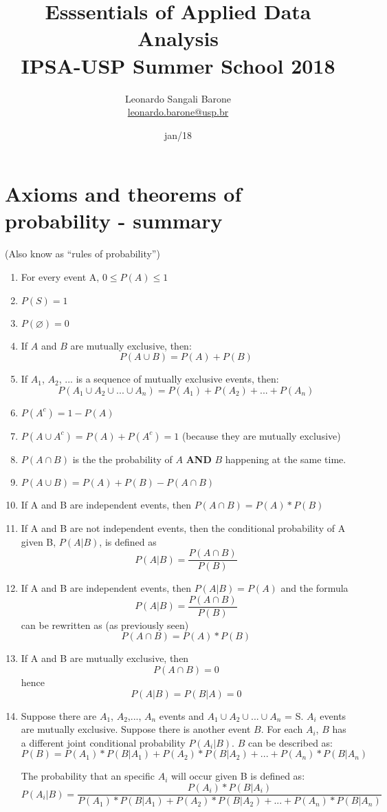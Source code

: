\documentclass[11pt]{article}
\title{\textbf{Esssentials of Applied Data Analysis\\
				IPSA-USP Summer School 2018}}
\author{Leonardo Sangali Barone\\ \href{leonardo.barone@usp.br}{leonardo.barone@usp.br}}
\date{jan/18}
\let\emptyset\varnothing
\begin{document}
\maketitle

\section*{Axioms and theorems of probability - summary}

	(Also know as ``rules of probability'')

	\begin{enumerate}
		\item For every event A, $0 \leq P(A) \leq 1$
		\item $P(S) = 1$
		\item $P(\emptyset) = 0$
		\item  If $A$ and $B$ are mutually exclusive, then:
	\[P(A \cup B) = P(A) + P (B)\]
		\item  If $A_1$, $A_2$, ... is a sequence of mutually exclusive events, then:
	\[P(A_1 \cup A_2 \cup ... \cup A_n) = P(A_1) + P (A_2) + ... + P(A_n)\]
		\item  $P(A^c) = 1 - P(A)$
		\item  $P(A \cup A^c) = P(A) + P(A^c) = 1$ (because they are mutually exclusive)
		\item $P(A \cap B)$ is the the probability of $A$ \textbf{AND} $B$ happening at the same time.																																																																																																																		
		\item  $P(A \cup B) = P(A) + P(B) - P(A \cap B)$
		\item If A and B are independent events, then $P(A \cap B) = P(A) * P(B)$
		\item If A and B are not independent events, then the conditional probability of A given B, $P(A|B)$, 	is defined as
	\[P(A|B) = \frac{P(A\cap B)}{P(B)}\]
		\item If A and B are independent events, then $P(A|B) = P(A)$ and the formula
	\[P(A|B) = \frac{P(A\cap B)}{P(B)}\]
	can be rewritten as (as previously seen)
	\[P(A\cap B) = P(A)*P(B)\]
		\item If A and B are mutually exclusive, then
		\[P(A\cap B) = 0\]
			hence
		 \[P(A|B) = P(B|A) = 0\] 
		\item Suppose there are $A_1$, $A_2$,..., $A_n$ events and $A_1 \cup A_2 \cup... \cup A_n$ = S. $A_i$ events are mutually exclusive. Suppose there is another event $B$. For each $A_i$, $B$ has a different joint conditional probability $P(A_i|B)$. $B$ can be described as:
	\[P(B) = P(A_1)*P(B|A_1)+P(A_2)*P(B|A_2)+...+P(A_n)*P(B|A_n)\]
 
	The probability that an specific $A_i$ will occur given B is defined as:
	\[P(A_i|B) = \frac{P(A_i)*P(B|A_i)}{P(A_1)*P(B|A_1)+P(A_2)*P(B|A_2)+...+P(A_n)*P(B|A_n)}\]
	
	\end{enumerate}
\end{document}
